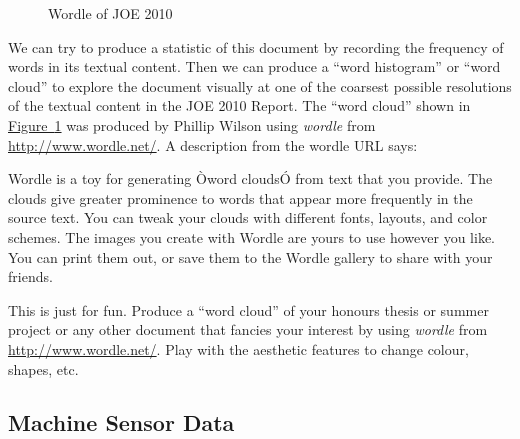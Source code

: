 \begin{figure}[htpb]
\caption{Wordle of JOE 2010\label{F:joe_vs_wordle}}
\centering   {}
\end{figure}

We can try to produce a statistic of this document by recording the frequency of words in its textual content. Then we can produce a ``word histogram'' or ``word cloud'' to explore the document visually at one of the coarsest possible resolutions of the textual content in the JOE 2010 Report.  The ``word cloud'' shown in \hyperref[F:joe_vs_wordle]{Figure~\ref*{F:joe_vs_wordle}} was produced by Phillip Wilson using {\em wordle} from \href{http://www.wordle.net/}{\url{http://www.wordle.net/}}.  A description from the wordle URL says:

{\small
Wordle is a toy for generating Òword cloudsÓ from text that you provide. The clouds give greater prominence to words that appear more frequently in the source text. You can tweak your clouds with different fonts, layouts, and color schemes. The images you create with Wordle are yours to use however you like. You can print them out, or save them to the Wordle gallery to share with your friends.
}

\begin{labwork}\label{LW:JoeWordle}  This is just for fun.  Produce a ``word cloud'' of your honours thesis or summer project or any other document that fancies your interest by using {\em wordle} from \href{http://www.wordle.net/}{\url{http://www.wordle.net/}}. Play with the aesthetic features to change colour, shapes, etc.\end{labwork}

\subsection{Machine Sensor Data}

